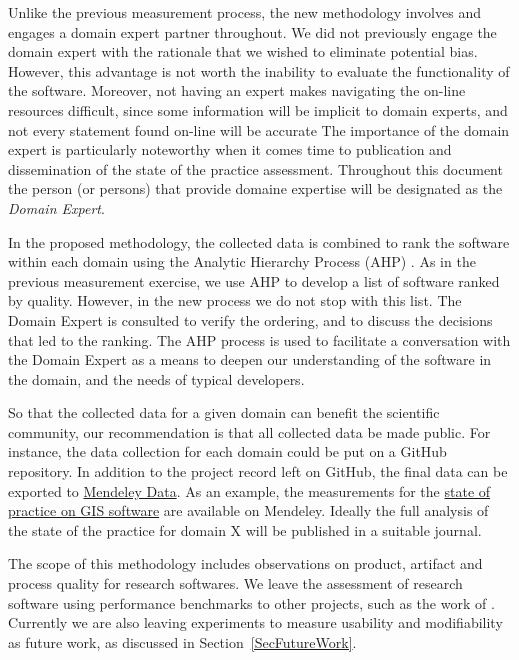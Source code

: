 \documentclass[letterpaper,cleveref]{lipics-v2019}
\begin{document}
Unlike the previous measurement process, the new methodology involves and
engages a domain expert partner throughout.  We did not previously engage the
domain expert with the rationale that we wished to eliminate potential bias.
However, this advantage is not worth the inability to evaluate the functionality
of the software.  Moreover, not having an expert makes navigating the on-line
resources difficult, since some information will be implicit to domain experts,
and not every statement found on-line will be accurate   The importance of the
domain expert is particularly noteworthy when it comes time to publication and
dissemination of the state of the practice assessment.  Throughout this document
the person (or persons) that provide domaine expertise will be designated as the
\textit{Domain Expert}.

In the proposed methodology, the collected data is combined to rank the software
within each domain using the Analytic Hierarchy Process (AHP) \citep{Saaty1980}.
As in the previous measurement exercise, we use AHP to develop a list of
software ranked by quality.  However, in the new process we do not stop with
this list.  The Domain Expert is consulted to verify the ordering, and to
discuss the decisions that led to the ranking.  The AHP process is used to
facilitate a conversation with the Domain Expert as a means to deepen our
understanding of the software in the domain, and the needs of typical
developers.

So that the collected data for a given domain can benefit the scientific
community, our recommendation is that all collected data be made public.  For
instance, the data collection for each domain could be put on a GitHub
repository.  In addition to the project record left on GitHub, the final data
can be exported to \href{https://data.mendeley.com/}{Mendeley Data}.  As an
example, the measurements for the
\href{https://data.mendeley.com/datasets/6kprpvv7r7/1} {state of practice on GIS
software} are available on Mendeley.  Ideally the full analysis of the state of
the practice for domain X will be published in a suitable journal.

The scope of this methodology includes observations on product, artifact and
process quality for research softwares. We leave the assessment of research
software using performance benchmarks to other projects, such as the work of
\cite{kaagstrom1998gemm}.  Currently we are also leaving experiments to measure
usability and modifiability as future work, as discussed in
Section~\ref{SecFutureWork}.
\end{document}
